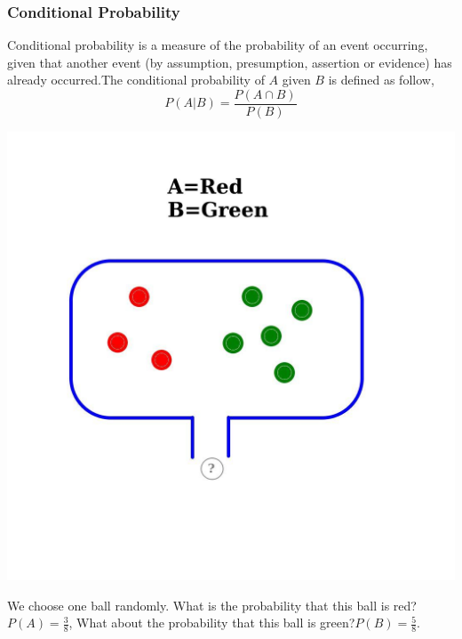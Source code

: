 \documentclass[12pt,aspectratio=169]{beamer}
\begin{document}
\begin{frame}
\frametitle{Conditional Probability}
Conditional probability is a measure of the probability of an event occurring, given that another event (by assumption, presumption, assertion or evidence) has already occurred.\pause  The conditional probability of $A$ given $B$ is defined as follow,
\[
P(A|B)=\frac{P(A\cap B)}{P(B)}
\]
\end{frame}

\begin{frame}
\begin{center}
\includegraphics[scale=0.2]{balls}
\end{center}\pause
We choose one ball randomly. What is the probability that this ball is red?
\pause $P(A)=\frac{3}{8}$, \pause What about the probability that this ball is green?\pause $P(B)=\frac{5}{8}$.

\end{frame}
\end{document}
